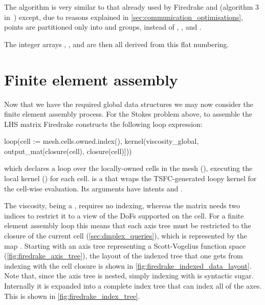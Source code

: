 \documentclass[thesis]{subfiles}
\begin{document}
The algorithm is very similar to that already used by Firedrake and  (algorithm 3 in~\cite{langeEfficientMeshManagement2016}) except, due to reasons explained in \cref{sec:communication_optimisations}, points are partitioned only into \ownediter{} and \ghostiter{} groups, instead of \coreiter{}, \ownediter{}, and \ghostiter{}.

The integer arrays , , and  are then all derived from this flat numbering.

\section{Finite element assembly}

Now that we have the required global data structures we may now consider the finite element assembly process.
For the Stokes problem above, to assemble the LHS matrix Firedrake constructs the following  loop expression:
\begin{pyinline}
  loop(cell := mesh.cells.owned.index(),
       kernel(viscosity_global,
              output_mat[closure(cell), closure(cell)]))
\end{pyinline}
which declares a loop over the locally-owned cells in the mesh (), executing the local kernel () for each cell.
 is a   that wraps the TSFC-generated loopy kernel for the cell-wise evaluation.
Its arguments have intents  and .

The viscosity, being a , requires no indexing, whereas the matrix needs two indices to restrict it to a view of the DoFs supported on the cell.
For a finite element assembly loop this means that each axis tree must be restricted to the closure of the current cell (\cref{sec:dmplex_queries}), which is represented by the map .
Starting with an axis tree representing a Scott-Vogelius function space (\cref{fig:firedrake_axis_tree}), the layout of the indexed tree that one gets from indexing with the cell closure is shown in \cref{fig:firedrake_indexed_data_layout}.
Note that, since the axis tree is nested, simply indexing with  is syntactic sugar.
Internally it is expanded into a complete index tree that can index all of the axes.
This is shown in \cref{fig:firedrake_index_tree}.
\end{document}
